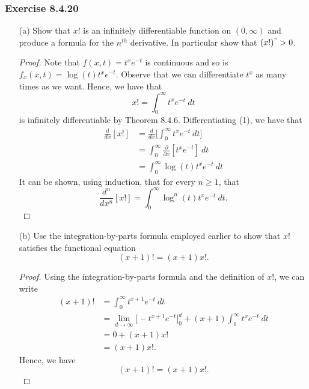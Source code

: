 \subsubsection{Exercise 8.4.20} 
\begin{enumerate}
    \item[(a)] Show that \( x!  \) is an infinitely differentiable function on \( (0, \infty ) \) and produce a formula for the \( n^{th} \) derivative. In particular show that \( (x!)^{"} > 0 \). 
        \begin{proof}
            Note that \( f(x,t) = t^{x} e^{-t } \) is continuous and so is \( f_{x}(x,t) = \log(t) t^{x} e^{-t }  \). Observe that we can differentiate \( t^{x}  \) as many times as we want. Hence, we have that 
            \[  x! = \int_{ 0  }^{ \infty  }  t^{x} e^{-t} \ dt \tag{1}  \] is infinitely differentiable by Theorem 8.4.6.  Differentiating (1), we have that  
            \begin{align*}
                \frac{d  }{d x } [ x! ]  &= \frac{ d }{ dx  } \Big[ \int_{ 0 }^{ \infty  }  t^{x} e^{-t} \ dt \Big]  \\
                                         &= \int_{ 0 }^{ \infty  } \frac{\partial  }{\partial x }  [ t^{x} e^{-t }] \ dt \\
                                         &= \int_{ 0 }^{ \infty  } \log(t) t^{x} e^{-t } \ dt 
            \end{align*}
            It can be shown, using induction, that for every \( n \geq  1  \), that 
            \[  \frac{d ^{n}  }{d x^{n} } [ x! ] = \int_{ 0 }^{ \infty  }  \log^{n}(t) t^{x} e^{-t} \ dt. \]
        \end{proof}
    \item[(b)] Use the integration-by-parts formula employed earlier to show that \( x!  \) satisfies the functional equation 
        \[  (x+1)! = (x+1) x!. \]
        \begin{proof}
        Using the integration-by-parts formula and the definition of \( x!  \), we can write 
        \begin{align*}
            (x+1)! &= \int_{ 0 }^{ \infty  } t^{x+1} e^{-t } \ dt \\
                   &= \lim_{ d \to \infty  } \Big[ - t^{x+1} e^{-t} \Big]_{0}^{d} + (x+1) \int_{ 0 }^{ \infty  } t^{x} e^{-t} \    dt \\
                   &= 0 + (x+1) x! \\
                   &= (x+1) x!.
        \end{align*}
        Hence, we have 
        \[  (x+1)! = (x+1)x!. \]
        \end{proof}
\end{enumerate}

